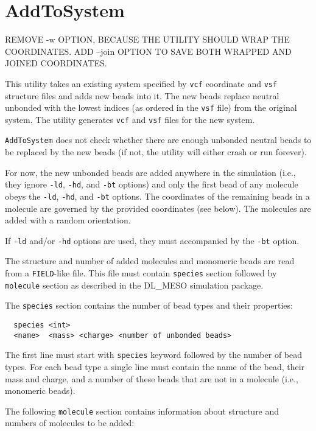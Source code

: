 \section{AddToSystem} \label{sec:AddToSystem}

REMOVE -w OPTION, BECAUSE THE UTILITY SHOULD WRAP THE COORDINATES. ADD
--join OPTION TO SAVE BOTH WRAPPED AND JOINED COORDINATES.

This utility takes an existing system specified by \texttt{vcf} coordinate
and \texttt{vsf} structure files and adds new beads into it. The new beads
replace neutral unbonded with the lowest indices (as ordered in the
\texttt{vsf} file) from the original system. The utility generates
\texttt{vcf} and \texttt{vsf} files for the new system.

\texttt{AddToSystem} does not check whether there are enough unbonded
neutral beads to be replaced by the new beads (if not, the utility will
either crash or run forever).

For now, the new unbonded beads are added anywhere in the simulation
(i.e., they ignore \texttt{-ld}, \texttt{-hd}, and \texttt{-bt} options)
and only the first bead of any molecule obeys the \texttt{-ld},
\texttt{-hd}, and \texttt{-bt} options. The coordinates of the remaining
beads in a molecule are governed by the provided coordinates (see below).
The molecules are added with a random orientation.

If \texttt{-ld} and/or \texttt{-hd} options are used, they must accompanied
by the \texttt{-bt} option.

The structure and number of added molecules and monomeric beads are read
from a \texttt{FIELD}-like file. This file must contain \texttt{species}
section followed by \texttt{molecule} section as described in the DL\_MESO
simulation package.

The \texttt{species} section contains the number of bead types and their
properties:
\begin{verbatim}
  species <int>
  <name>  <mass> <charge> <number of unbonded beads>
\end{verbatim}
The first line must start with \texttt{species} keyword followed by the
number of bead types. For each bead type a single line must contain the name of
the bead, their mass and charge, and a number of these beads that are not
in a molecule (i.e., monomeric beads).

The following \texttt{molecule} section contains information about
structure and numbers of molecules to be added:

